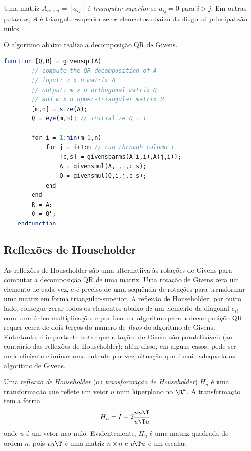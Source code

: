 \documentclass{article}
\begin{document}
\begin{defn}
    Uma matriz \(A_{m \times n} = [a_{ij}]\) é \emph{triangular-superior} se \(a_{ij} = 0\) para \(i > j\). Em outras palavras, \(A\) é triangular-superior se os elementos abaixo da diagonal principal são nulos.
\end{defn}

O algoritmo abaixo realiza a decomposição QR de Givens.

\begin{lstlisting}[language=Scilab, caption=Decomposição QR de Givens]
    function [Q,R] = givensqr(A)
        // compute the QR decomposition of A
        // input: m x n matrix A
        // output: m x n orthogonal matrix Q
        // and m x n upper-triangular matrix R
        [m,n] = size(A);
        Q = eye(m,m); // initialize Q = I
        
        for i = 1:min(m-1,n)
            for j = i+1:m // run through column i
                [c,s] = givensparms(A(i,i),A(j,i));
                A = givensmul(A,i,j,c,s);
                Q = givensmul(Q,i,j,c,s);
            end
        end
        R = A;
        Q = Q';
    endfunction
\end{lstlisting}

\subsection{Reflexões de Householder}

As reflexões de Householder são uma alternatiiva às rotações de Givens para computar a decomposição QR de uma matriz. Uma rotação de Givens zera um elemento de cada vez, e é preciso de uma sequência de rotações para transformar uma matriz em forma triangular-superior. A reflexão de Householder, por outro lado, consegue zerar todos os elementos abaixo de um elemento da diagonal \(a_{ii}\) com uma única multiplicação, e por isso seu algoritmo para a decomposição QR requer cerca de dois-terços do número de \emph{flops} do algoritmo de Givens. 
Entretanto, é importante notar que rotações de Givens são paralelizáveis (ao contrário das reflexões de Householder); além disso, em alguns casos, pode ser mais eficiente eliminar uma entrada por vez, situação que é mais adequada ao algoritmo de Givens.

\begin{defn}
    Uma \emph{reflexão de Householder} (ou \emph{transformação de Householder}) \(H_u\) é uma transformação que reflete um vetor \(u\) num hiperplano no \(\R^n\). A transformação tem a forma
\begin{equation}
    H_u = I - 2\frac{uu\T }{u\T u},
\end{equation}
onde \(u\) é um vetor não nulo. Evidentemente, \(H_u\) é uma matriz quadrada de ordem \(n\), pois \(uu\T \) é uma matriz \(n \times n\) e \(u\T u\) é um escalar.
\end{defn}
\end{document}
